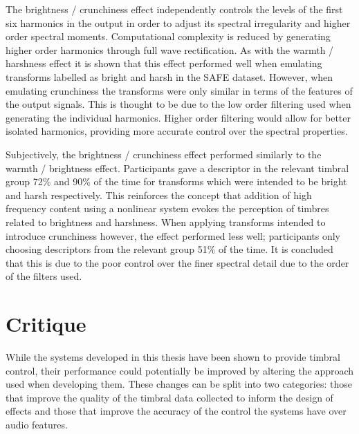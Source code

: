 	The brightness / crunchiness effect independently controls the levels of the first six harmonics in the output in
	order to adjust its spectral irregularity and higher order spectral moments. Computational complexity is reduced by
	generating higher order harmonics through full wave rectification. As with the warmth / harshness effect it is shown
	that this effect performed well when emulating transforms labelled as bright and harsh in the SAFE dataset. However,
	when emulating crunchiness the transforms were only similar in terms of the features of the output signals. This is
	thought to be due to the low order filtering used when generating the individual harmonics. Higher order filtering
	would allow for better isolated harmonics, providing more accurate control over the spectral properties.

	Subjectively, the brightness / crunchiness effect performed similarly to the warmth / brightness effect.
	Participants gave a descriptor in the relevant timbral group 72\% and 90\% of the time for transforms which were
	intended to be bright and harsh respectively. This reinforces the concept that addition of high frequency content
	using a nonlinear system evokes the perception of timbres related to brightness and harshness. When applying
	transforms intended to introduce crunchiness however, the effect performed less well; participants only choosing
	descriptors from the relevant group 51\% of the time. It is concluded that this is due to the poor control over the
	finer spectral detail due to the order of the filters used.

\section{Critique}
\label{sec:Conclusion-Critique}
	While the systems developed in this thesis have been shown to provide timbral control, their performance could
	potentially be improved by altering the approach used when developing them. These changes can be split into two
	categories: those that improve the quality of the timbral data collected to inform the design of effects and those
	that improve the accuracy of the control the systems have over audio features.

